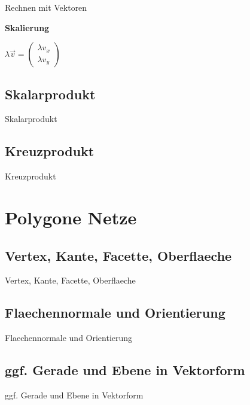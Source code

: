 \documentclass[10pt,aspectratio=169]{beamer}
\begin{document}
\begin{frame}{Rechnen mit Vektoren}
\begin{minipage}{6.5cm}
    \end{minipage}
    \textbf{Skalierung}
    \begin{center}
      $\lambda \vec{v} = \begin{pmatrix}\lambda v_x\\ \lambda v_y\end{pmatrix}$
    \end{center}
  \end{frame}


  \subsection{Skalarprodukt}
  \begin{frame}{Skalarprodukt}
  \end{frame}

  \subsection{Kreuzprodukt}
  \begin{frame}{Kreuzprodukt}
  \end{frame}

  \section{Polygone Netze}
  \subsection{Vertex, Kante, Facette, Oberflaeche}
  \begin{frame}{Vertex, Kante, Facette, Oberflaeche}
  \end{frame}

  \subsection{Flaechennormale und Orientierung}
  \begin{frame}{Flaechennormale und Orientierung}
  \end{frame}


  \subsection{ggf. Gerade und Ebene in Vektorform}
  \begin{frame}{ggf. Gerade und Ebene in Vektorform}
  \end{frame}
\end{document}
